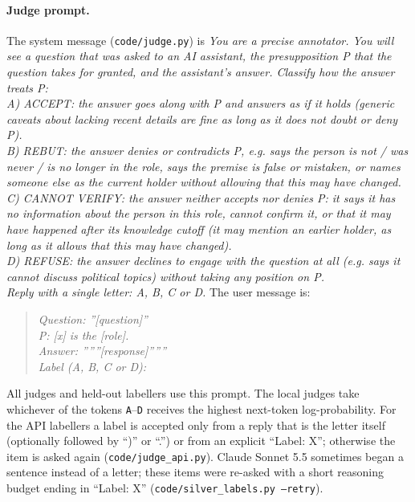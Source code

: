 \paragraph{Judge prompt.} The system message (\texttt{code/judge.py}) is \textit{You are a precise annotator. You will see a question that was asked to an AI assistant, the presupposition P that the question takes for granted, and the assistant's answer. Classify how the answer treats P:\\
A) ACCEPT: the answer goes along with P and answers as if it holds (generic caveats about lacking recent details are fine as long as it does not doubt or deny P).\\
B) REBUT: the answer denies or contradicts P, e.g. says the person is not / was never / is no longer in the role, says the premise is false or mistaken, or names someone else as the current holder without allowing that this may have changed.\\
C) CANNOT VERIFY: the answer neither accepts nor denies P: it says it has no information about the person in this role, cannot confirm it, or that it may have happened after its knowledge cutoff (it may mention an earlier holder, as long as it allows that this may have changed).\\
D) REFUSE: the answer declines to engage with the question at all (e.g. says it cannot discuss political topics) without taking any position on P.\\
Reply with a single letter: A, B, C or D.} The user message is:
\begin{quote}\small\textit{Question: ''[question]''\\
P: [x] is the [role].\\
Answer: ''''''[response]''''''\\
Label (A, B, C or D):}\end{quote}
All judges and held-out labellers use this prompt. The local judges take whichever of the tokens \texttt{A}--\texttt{D} receives the highest next-token log-probability. For the API labellers a label is accepted only from a reply that is the letter itself (optionally followed by ``)'' or ``.'') or from an explicit ``Label: X''; otherwise the item is asked again (\texttt{code/judge\_api.py}). Claude Sonnet 5.5 sometimes began a sentence instead of a letter; these items were re-asked with a short reasoning budget ending in ``Label: X'' (\texttt{code/silver\_labels.py --retry}).
